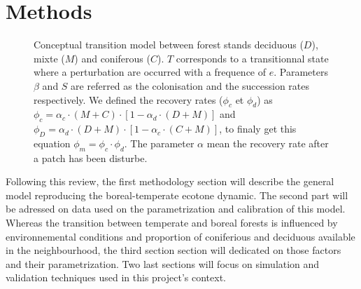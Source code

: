 
\section{Methods}   

\begin{figure}         
	
	\caption{Conceptual transition model between forest stands deciduous ($D$),
	mixte ($M$) and coniferous ($C$). $T$ corresponds to a transitionnal state
	where a perturbation are occurred with a frequence of $e$. Parameters $\beta$
	and $S$ are referred as the colonisation and the succession rates
	respectively. We defined the recovery rates ($\phi_c$ et $\phi_d$) as $\phi_c
	= \alpha_c \cdot (M+C) \cdot [1- \alpha_d \cdot (D +M)]$ and $\phi_D =
	\alpha_d \cdot (D+M) \cdot [1- \alpha_c \cdot (C +M)]$, to finaly get this
	equation $\phi_m = \phi_c \cdot \phi_d$. The parameter $\alpha$ mean the
	recovery rate after a patch has been disturbe.}         
	\label{Model}
\end{figure}


Following this review, the first methodology section will describe the general
model reproducing the boreal-temperate ecotone dynamic. The second part will
be adressed on data used on the parametrization and calibration of this model.
Whereas the transition between temperate and boreal forests is influenced by
environnemental conditions and proportion of coniferious and deciduous
available in the neighbourhood, the third section section will dedicated on
those factors and their parametrization. Two last sections will focus on
simulation and validation techniques used in this project's context.\\

